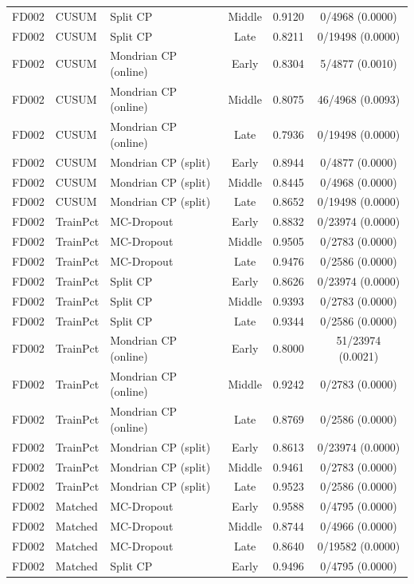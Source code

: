 \begin{table}[t]
\begin{tabular}{lllccc}
FD002 & CUSUM & Split CP & Middle & 0.9120 & 0/4968 (0.0000) \\
FD002 & CUSUM & Split CP & Late & 0.8211 & 0/19498 (0.0000) \\
FD002 & CUSUM & Mondrian CP (online) & Early & 0.8304 & 5/4877 (0.0010) \\
FD002 & CUSUM & Mondrian CP (online) & Middle & 0.8075 & 46/4968 (0.0093) \\
FD002 & CUSUM & Mondrian CP (online) & Late & 0.7936 & 0/19498 (0.0000) \\
FD002 & CUSUM & Mondrian CP (split) & Early & 0.8944 & 0/4877 (0.0000) \\
FD002 & CUSUM & Mondrian CP (split) & Middle & 0.8445 & 0/4968 (0.0000) \\
FD002 & CUSUM & Mondrian CP (split) & Late & 0.8652 & 0/19498 (0.0000) \\
FD002 & TrainPct & MC-Dropout & Early & 0.8832 & 0/23974 (0.0000) \\
FD002 & TrainPct & MC-Dropout & Middle & 0.9505 & 0/2783 (0.0000) \\
FD002 & TrainPct & MC-Dropout & Late & 0.9476 & 0/2586 (0.0000) \\
FD002 & TrainPct & Split CP & Early & 0.8626 & 0/23974 (0.0000) \\
FD002 & TrainPct & Split CP & Middle & 0.9393 & 0/2783 (0.0000) \\
FD002 & TrainPct & Split CP & Late & 0.9344 & 0/2586 (0.0000) \\
FD002 & TrainPct & Mondrian CP (online) & Early & 0.8000 & 51/23974 (0.0021) \\
FD002 & TrainPct & Mondrian CP (online) & Middle & 0.9242 & 0/2783 (0.0000) \\
FD002 & TrainPct & Mondrian CP (online) & Late & 0.8769 & 0/2586 (0.0000) \\
FD002 & TrainPct & Mondrian CP (split) & Early & 0.8613 & 0/23974 (0.0000) \\
FD002 & TrainPct & Mondrian CP (split) & Middle & 0.9461 & 0/2783 (0.0000) \\
FD002 & TrainPct & Mondrian CP (split) & Late & 0.9523 & 0/2586 (0.0000) \\
FD002 & Matched & MC-Dropout & Early & 0.9588 & 0/4795 (0.0000) \\
FD002 & Matched & MC-Dropout & Middle & 0.8744 & 0/4966 (0.0000) \\
FD002 & Matched & MC-Dropout & Late & 0.8640 & 0/19582 (0.0000) \\
FD002 & Matched & Split CP & Early & 0.9496 & 0/4795 (0.0000) \\

\end{tabular}
\end{table}
